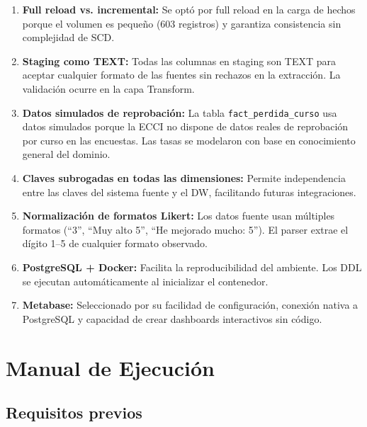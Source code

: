 \documentclass[12pt, letterpaper]{article}
\begin{document}
\begin{enumerate}
  \item \textbf{Full reload vs. incremental:} Se optó por full reload en la carga de hechos porque el volumen es pequeño (603 registros) y garantiza consistencia sin complejidad de SCD.

  \item \textbf{Staging como TEXT:} Todas las columnas en staging son TEXT para aceptar cualquier formato de las fuentes sin rechazos en la extracción. La validación ocurre en la capa Transform.

  \item \textbf{Datos simulados de reprobación:} La tabla \texttt{fact\_perdida\_curso} usa datos simulados porque la ECCI no dispone de datos reales de reprobación por curso en las encuestas. Las tasas se modelaron con base en conocimiento general del dominio.

  \item \textbf{Claves subrogadas en todas las dimensiones:} Permite independencia entre las claves del sistema fuente y el DW, facilitando futuras integraciones.

  \item \textbf{Normalización de formatos Likert:} Los datos fuente usan múltiples formatos (``3'', ``Muy alto 5'', ``He mejorado mucho: 5''). El parser extrae el dígito 1--5 de cualquier formato observado.

  \item \textbf{PostgreSQL + Docker:} Facilita la reproducibilidad del ambiente. Los DDL se ejecutan automáticamente al inicializar el contenedor.

  \item \textbf{Metabase:} Seleccionado por su facilidad de configuración, conexión nativa a PostgreSQL y capacidad de crear dashboards interactivos sin código.
\end{enumerate}

\section{Manual de Ejecución}

\subsection{Requisitos previos}
\end{document}
